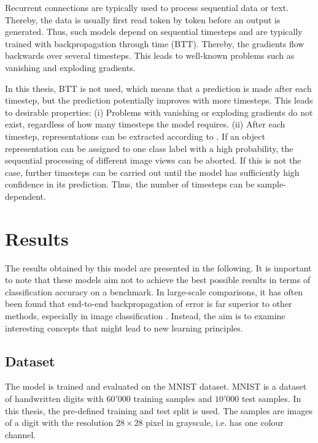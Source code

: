 Recurrent connections are typically used to process sequential data or text. Thereby, the data is usually first read token by token before an output is generated. Thus, such models depend on sequential timesteps and are typically trained with backpropagation through time (BTT). Thereby, the gradients flow backwards over several timesteps. This leads to well-known problems such as vanishing and exploding gradients.

In this thesis, BTT is not used, which means that a prediction is made after each timestep, but the prediction potentially improves with more timesteps. This leads to desirable properties: (i) Problems with vanishing or exploding gradients do not exist, regardless of how many timesteps the model requires. (ii) After each timestep, representations can be extracted according to . If an object representation can be assigned to one class label with a high probability, the sequential processing of different image views can be aborted. If this is not the case, further timesteps can be carried out until the model has sufficiently high confidence in its prediction. Thus, the number of timesteps can be sample-dependent.



\section{Results}
The results obtained by this model are presented in the following. It is important to note that these models aim not to achieve the best possible results in terms of classification accuracy on a benchmark. In large-scale comparisons, it has often been found that end-to-end backpropagation of error is far superior to other methods, especially in image classification . Instead, the aim is to examine interesting concepts that might lead to new learning principles.

\subsection{Dataset}
The model is trained and evaluated on the MNIST \cite{Lecun_Bottou_Bengio_Haffner_1998} dataset. MNIST is a dataset of handwritten digits with $60'000$ training samples and $10'000$ test samples.
In this thesis, the pre-defined training and test split is used.
The samples are images of a digit with the resolution $28 \times 28$ pixel in grayscale, i.e. has one colour channel.

